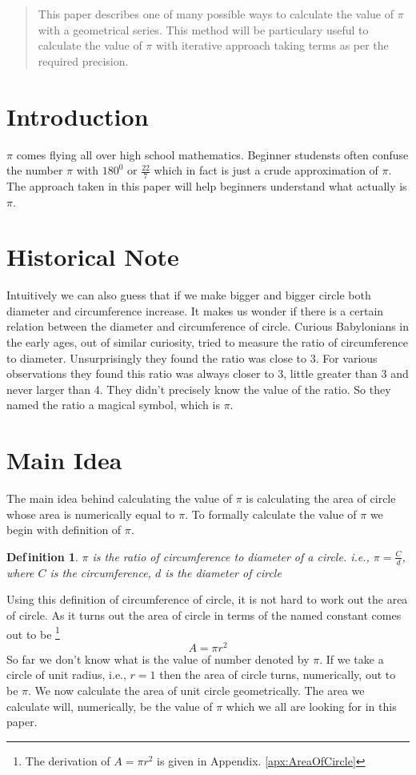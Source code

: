 \documentclass{IEEEtran}
\theoremstyle{definition} \newtheorem{Definition}{Def{\,}inition}
\begin{document}
	\stMakeTitle
\begin{abstract}
This paper describes one of many possible ways to calculate the value of $\pi$ with a geometrical series. This method will be particulary useful to calculate the value of $\pi$ with iterative approach taking terms as per the required precision.
\end{abstract}


\section{Introduction}
$\pi$ comes flying all over high school mathematics. Beginner studensts often confuse the number $\pi$ with $180^0$ or $\frac{22}{7}$ which in fact is just a crude approximation of $\pi$. The approach taken in this paper will help beginners understand what actually is $\pi$.


\section{Historical Note}
Intuitively we can also guess that if we make bigger and bigger circle both diameter and circumference increase. It makes us wonder if there is a certain relation between the diameter and circumference of circle. Curious Babylonians in the early ages, out of similar curiosity, tried to measure the ratio of circumference to diameter. Unsurprisingly they found the ratio was close to $3$. For various observations they found this ratio was always closer to 3, little greater than 3 and never larger than 4. They didn't precisely know the value of the ratio. So they named the ratio a magical symbol, which is $\pi$.
\section{Main Idea}
The main idea behind calculating the value of $\pi$ is calculating the area of circle whose area is numerically equal to $\pi$. To formally calculate the value of $\pi$ we begin with definition of $\pi$.
\begin{Definition}
	\emph{ $\pi$ is the ratio of circumference to diameter of a circle. i.e., $\pi = \frac{C}{d}$, where $C$ is the circumference, $d$ is the diameter of circle}
\end{Definition}
Using this definition of circumference of circle, it is not hard to work out the area of circle. As it turns out the area of circle in terms of the named constant comes out to be \footnote{The derivation of $A = \pi r^2$ is given in Appendix. \ref{apx:AreaOfCircle} } \[ A = \pi r^2 \]
So far we don't know what is the value of number denoted by $\pi$. If we take a circle of unit radius, i.e., $r = 1$ then the area of circle turns, numerically, out to be $\pi$. We now calculate the area of unit circle geometrically. The area we calculate will, numerically, be the value of $\pi$ which we all are looking for in this paper.
			
\end{document}
